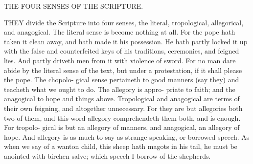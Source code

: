 \documentclass{custom}
\begin{document}
THE FOUR SENSES OF THE SCRIPTURE. 

THEY divide the Scripture into four senses, the literal, 
tropological, allegorical, and anagogical. The literal 
sense is become nothing at all. For the pope hath taken 
it clean away, and hath made it his possession. He hath 
partly locked it up with the false and counterfeited keys 
of his traditions, ceremonies, and feigned lies. And partly 
driveth men from it with violence of sword. For no man 
dare abide by the literal sense of the text, but under a 
protestation, if it shall please the pope. The chopolo- 
gical sense pertaineth to good manners (say they) and 
teacheth what we ought to do. The allegory is appro- 
priate to faith; and the anagogical to hope and things 
above. Tropological and anagogical are terms of their 
own feigning, and altogether unnecessary. For they are 
but allegories both two of them, and this word allegory 
comprehendeth them both, and is enough. For tropolo- 
gical is but an allegory of manners, and anagogical, an 
allegory of hope. And allegory is as much to say as
strange speaking, or borrowed speech. As when we say
of a wanton child, this sheep hath magots in his tail, he 
must be anointed with birchen salve; which speech I 
borrow of the shepherds. 
\end{document}
